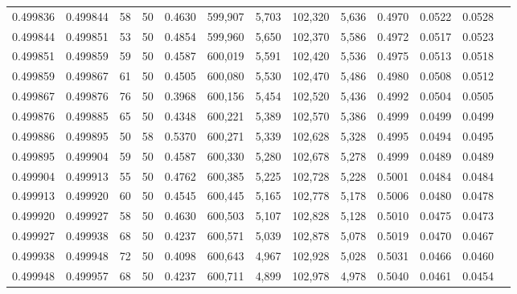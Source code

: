 \begin{tabular}{rrrrrrrrrrrrr}
0.499836 & 0.499844 &    58 &  50 &                                     0.4630 & 599,907 &   5,703 & 102,320 &   5,636 & 0.4970 & 0.0522 & 0.0528 \\
0.499844 & 0.499851 &    53 &  50 &                                     0.4854 & 599,960 &   5,650 & 102,370 &   5,586 & 0.4972 & 0.0517 & 0.0523 \\
0.499851 & 0.499859 &    59 &  50 &                                     0.4587 & 600,019 &   5,591 & 102,420 &   5,536 & 0.4975 & 0.0513 & 0.0518 \\
0.499859 & 0.499867 &    61 &  50 &                                     0.4505 & 600,080 &   5,530 & 102,470 &   5,486 & 0.4980 & 0.0508 & 0.0512 \\
0.499867 & 0.499876 &    76 &  50 &                                     0.3968 & 600,156 &   5,454 & 102,520 &   5,436 & 0.4992 & 0.0504 & 0.0505 \\
0.499876 & 0.499885 &    65 &  50 &                                     0.4348 & 600,221 &   5,389 & 102,570 &   5,386 & 0.4999 & 0.0499 & 0.0499 \\
0.499886 & 0.499895 &    50 &  58 &                                     0.5370 & 600,271 &   5,339 & 102,628 &   5,328 & 0.4995 & 0.0494 & 0.0495 \\
0.499895 & 0.499904 &    59 &  50 &                                     0.4587 & 600,330 &   5,280 & 102,678 &   5,278 & 0.4999 & 0.0489 & 0.0489 \\
0.499904 & 0.499913 &    55 &  50 &                                     0.4762 & 600,385 &   5,225 & 102,728 &   5,228 & 0.5001 & 0.0484 & 0.0484 \\
0.499913 & 0.499920 &    60 &  50 &                                     0.4545 & 600,445 &   5,165 & 102,778 &   5,178 & 0.5006 & 0.0480 & 0.0478 \\
0.499920 & 0.499927 &    58 &  50 &                                     0.4630 & 600,503 &   5,107 & 102,828 &   5,128 & 0.5010 & 0.0475 & 0.0473 \\
0.499927 & 0.499938 &    68 &  50 &                                     0.4237 & 600,571 &   5,039 & 102,878 &   5,078 & 0.5019 & 0.0470 & 0.0467 \\
0.499938 & 0.499948 &    72 &  50 &                                     0.4098 & 600,643 &   4,967 & 102,928 &   5,028 & 0.5031 & 0.0466 & 0.0460 \\
0.499948 & 0.499957 &    68 &  50 &                                     0.4237 & 600,711 &   4,899 & 102,978 &   4,978 & 0.5040 & 0.0461 & 0.0454 \\

\end{tabular}
